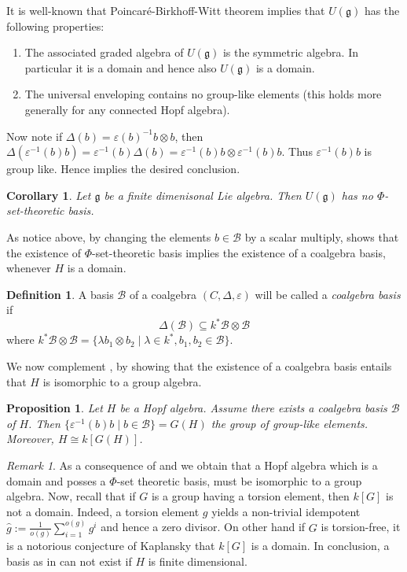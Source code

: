 \documentclass[a4paper,10pt]{amsart}
\newtheorem{proposition}[lemma]{Proposition}
\newtheorem{corollary}[lemma]{Corollary}
\theoremstyle{definition}
\newtheorem{definition}[lemma]{Definition}
\theoremstyle{remark}
\newtheorem*{remark*}{Remark}
\newcommand\D{\Delta}
\newcommand\eps{\varepsilon}
\newcommand\ot{\otimes}
\newcommand\mc{\mathcal}
\begin{document}
It is well-known that Poincar\'e-Birkhoff-Witt theorem implies that $U(\mathfrak{g})$ has the following properties:
\begin{enumerate}
    \item[(i)] The associated graded algebra of $U(\mathfrak{g})$ is the symmetric algebra. In particular it is a domain and hence also $U(\mathfrak{g})$ is a domain.
    \item[(ii)] The universal enveloping contains no group-like elements (this holds more generally for any connected Hopf algebra).
\end{enumerate}

Now note if $\D (b) = \eps(b)^{-1}b \ot b$, then $\D(\eps^{-1}(b) b) =\eps^{-1}(b) \D(b) = \eps^{-1}(b) b \ot \eps^{-1}(b)b.$ Thus $\eps^{-1}(b) b$ is group like. Hence  implies the desired conclusion.

\begin{corollary}\label{no set for Lie}
Let $\mathfrak{g}$ be a finite dimenisonal Lie algebra. Then $U(\mathfrak{g})$ has no $\Phi$-set-theoretic basis.
\end{corollary}

As notice above, by changing the elements $b \in \mc{B}$ by a scalar multiply,  shows that the existence of $\Phi$-set-theoretic basis implies the existence of a coalgebra basis, whenever $H$ is a domain.

\begin{definition}
A basis $\mc{B}$ of a coalgebra $(C,\D,\eps)$ will be called a \emph{coalgebra basis} if
\[
\D(\mc{B})\subseteq k^* \mc{B}\otimes \mc{B}
\]
where $k^* \mc{B}\otimes \mc{B}= \{ \lambda b_1 \ot b_2 \mid \lambda \in k^*, b_1,b_2 \in \mc{B}\}.$
\end{definition}

We now complement , by showing that the existence of a coalgebra basis entails that $H$ is isomorphic to a group algebra.

\begin{proposition}\label{thm:groupalgebra-under-coalgebasis}
Let $H$ be a Hopf algebra. Assume there exists a coalgebra basis $\mc{B}$ of $H$. Then $\{\eps^{-1}(b)b \mid b \in \mc{B} \} = G(H)$ the group of group-like elements. Moreover, $H \cong k[G(H)]$.
\end{proposition}

\begin{remark*}
As a consequence of  and  we obtain that a Hopf algebra which is a domain and posses a $\Phi$-set theoretic basis, must be isomorphic to a group algebra. Now, recall that if $G$ is a group having a torsion element, then $k[G]$ is not a domain. Indeed, a torsion element $g$ yields a non-trivial idempotent $\hat{g} := \frac{1}{o(g)} \sum_{i=1}^{o(g)} g^{i}$ and hence a zero divisor. On other hand if $G$ is torsion-free, it is a notorious conjecture of Kaplansky that $k[G]$ is a domain. In conclusion, a basis as in  can not exist if $H$ is finite dimensional.
\end{remark*}
\end{document}
